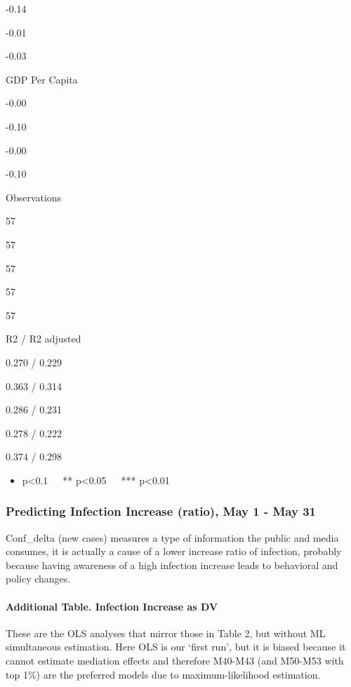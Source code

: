 \documentclass[
]{article}
\providecommand{\tightlist}{%
  \setlength{\itemsep}{0pt}\setlength{\parskip}{0pt}}
\begin{document}
-0.14

-0.01

-0.03

GDP Per Capita

-0.00

-0.10

-0.00

-0.10

Observations

57

57

57

57

57

R2 / R2 adjusted

0.270 / 0.229

0.363 / 0.314

0.286 / 0.231

0.278 / 0.222

0.374 / 0.298

\begin{itemize}
\tightlist
\item
  p\textless0.1~~~** p\textless0.05~~~*** p\textless0.01
\end{itemize}

\hypertarget{predicting-infection-increase-ratio-may-1---may-31}{%
\subsubsection{Predicting Infection Increase (ratio), May 1 - May
31}\label{predicting-infection-increase-ratio-may-1---may-31}}

Conf\_delta (new cases) measures a type of information the public and
media consumes, it is actually a cause of a lower increase ratio of
infection, probably because having awareness of a high infection
increase leads to behavioral and policy changes.

\hypertarget{additional-table.-infection-increase-as-dv}{%
\paragraph{Additional Table. Infection Increase as
DV}\label{additional-table.-infection-increase-as-dv}}

These are the OLS analyses that mirror those in Table 2, but without ML
simultaneous estimation. Here OLS is our `first run', but it is biased
because it cannot estimate mediation effects and therefore M40-M43 (and
M50-M53 with top 1\%) are the preferred models due to maximum-likelihood
estimation.
\end{document}
